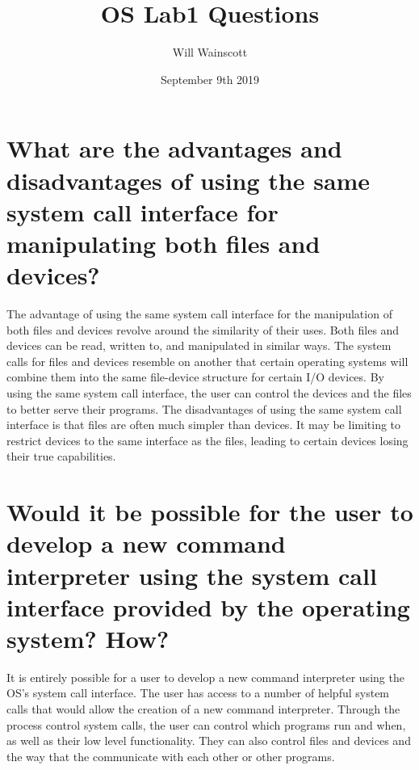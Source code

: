 \documentclass{article}
\title{OS Lab1 Questions}
\author{Will Wainscott}
\date{September 9th 2019}
\begin{document}
\maketitle

\section{What are the advantages and disadvantages of using the
same system call interface for manipulating both files and 
devices?}

The advantage of using the same system call interface for the manipulation of both files and devices revolve around the similarity of their uses. Both files and devices can be read, written to, and manipulated in similar ways. The system calls for files and devices resemble on another that certain operating systems will combine them into the same file-device structure for certain I/O devices. By using the same system call interface, the user can control the devices and the files to better serve their programs. The disadvantages of using the same system call interface is that files are often much simpler than devices. It may be limiting to restrict devices to the same interface as the files, leading to certain devices losing their true capabilities. 

\section{Would it be possible for the user to develop a new command interpreter using the system call interface provided by the operating system? How?}

It is entirely possible for a user to develop a new command interpreter using the OS's system call interface. The user has access to a number of helpful system calls that would allow the creation of a new command interpreter. Through the process control system calls, the user can control which programs run and when, as well as their low level functionality. They can also control files and devices and the way that the communicate with each other or other programs. 
\end{document}
